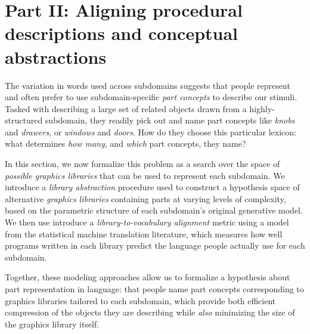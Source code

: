 \documentclass[10pt,letterpaper]{article}
\begin{document}


\section{Part II: Aligning procedural descriptions and conceptual abstractions}\label{sec-part-ii}
The variation in words used across subdomains suggests that people represent and often prefer to use subdomain-specific \textit{part concepts} to describe our stimuli. Tasked with describing a large set of related objects drawn from a highly-structured subdomain, they readily pick out and name part concepts like \textit{knobs} and \textit{drawers}, or 
\textit{windows} and \textit{doors}. How do they choose this particular lexicon: what determines \textit{how many}, and \textit{which} part concepts, they name?

In this section, we now formalize this problem as a search over the space of \textit{possible graphics libraries} that can be used to represent each subdomain. We introduce a \textit{library abstraction} procedure used to construct a hypothesis space of alternative \textit{graphics libraries} containing parts at varying levels of complexity, based on the parametric structure of each subdomain's original generative model. We then use introduce a \textit{library-to-vocabulary alignment} metric using a model from the statistical machine translation literature, which measures how well programs written in each library predict the language people actually use for each subdomain.

Together, these modeling approaches allow us to formalize a hypothesis about part representation in language: that people name part concepts corresponding to graphics libraries tailored to each subdomain, which provide both efficient compression of the objects they are describing while \textit{also} minimizing the size of the graphics library itself.
\end{document}
